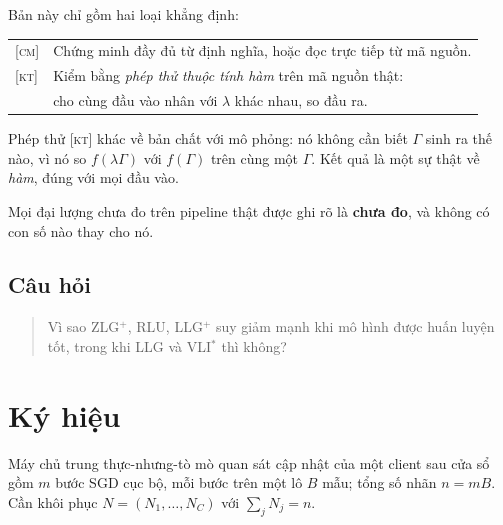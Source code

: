 \documentclass[11pt,a4paper]{article}
\theoremstyle{remark}
\begin{document}
Bản này chỉ gồm hai loại khẳng định:

\begin{center}
\begin{tabular}{@{}ll@{}}
\toprule
\textsc{[cm]} & Chứng minh đầy đủ từ định nghĩa, hoặc đọc trực tiếp từ mã nguồn. \\
\textsc{[kt]} & Kiểm bằng \emph{phép thử thuộc tính hàm} trên mã nguồn thật: \\
              & cho cùng đầu vào nhân với $\lambda$ khác nhau, so đầu ra. \\
\bottomrule
\end{tabular}
\end{center}

Phép thử \textsc{[kt]} khác về bản chất với mô phỏng: nó không cần biết
$\Gamma$ sinh ra thế nào, vì nó so $f(\lambda\Gamma)$ với $f(\Gamma)$ trên
cùng một $\Gamma$. Kết quả là một sự thật về \emph{hàm}, đúng với mọi đầu vào.

Mọi đại lượng chưa đo trên pipeline thật được ghi rõ là \textbf{chưa đo}, và
không có con số nào thay cho nó.

\subsection{Câu hỏi}

\begin{quote}
Vì sao ZLG$^+$, RLU, LLG$^+$ suy giảm mạnh khi mô hình được huấn luyện tốt,
trong khi LLG và VLI$^*$ thì không?
\end{quote}

\section{Ký hiệu}
\label{sec:kihieu}

Máy chủ trung thực-nhưng-tò mò quan sát cập nhật của một client sau cửa sổ
gồm $m$ bước SGD cục bộ, mỗi bước trên một lô $B$ mẫu; tổng số nhãn
$n=mB$. Cần khôi phục $N=(N_1,\dots,N_C)$ với $\sum_j N_j=n$.
\end{document}
